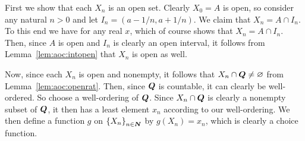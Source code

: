 {{    First we show that each $X_n$ is an open set.
    Clearly $X_0 = A$ is open, so consider any natural $n > 0$ and let $I_n = (a-1/n, a+1/n)$.
    We claim that $X_n = A \cap I_n$.
    To this end we have
    for any real $x$, which of course shows that $X_n = A \cap I_n$.
    Then, since $A$ is open and $I_n$ is clearly an open interval, it follows from Lemma~\ref{lem:aoc:intopen} that $X_n$ is open as well.

    Now, since each $X_n$ is open and nonempty, it follows that $X_n \cap {\boldsymbol{Q}} \neq \varnothing$ from Lemma~\ref{lem:aoc:openrat}.
    Then, since ${\boldsymbol{Q}}$ is countable, it can clearly be well-ordered.
    So choose a well-ordering of ${\boldsymbol{Q}}$.
    Since $X_n \cap {\boldsymbol{Q}}$ is clearly a nonempty subset of ${\boldsymbol{Q}}$, it then has a least element $x_n$ according to our well-ordering.
    We then define a function $g$ on $\left\{ X_n \right\}_{n \in {\boldsymbol{N}}}$ by $g(X_n) = x_n$, which is clearly a choice function.
  }
}

